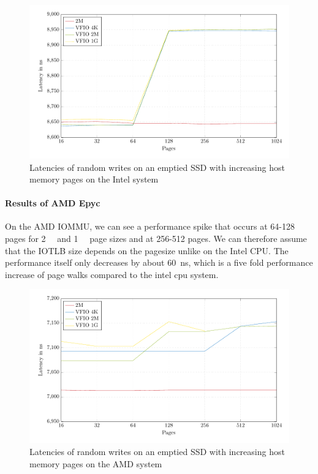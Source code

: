\begin{figure}
    \centering
    \includegraphics[width=\textwidth]{figures/psmeds}
    \caption{Latencies of random writes on an emptied SSD with increasing host memory pages on the Intel system}
    \label{fig:med-ps}
\end{figure}

\paragraph{Results of AMD Epyc}

On the AMD IOMMU, we can see a performance spike that occurs at 64-128 pages for \qty{2}{\mebi\byte} and \qty{1}{\gibi\byte} page sizes and at 256-512 pages. We can therefore assume that the IOTLB size depends on the pagesize unlike on the Intel CPU. The performance itself only decreases by about \qty{60}{ns}, which is a five fold performance increase of page walks compared to the intel cpu system.

\begin{figure}
    \centering
    \includegraphics[width=\textwidth]{figures/psmedsepyc}
    \caption{Latencies of random writes on an emptied SSD with increasing host memory pages on the AMD system}
    \label{fig:med-psepyc}
\end{figure}


